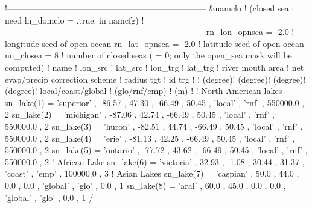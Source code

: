 \documentclass[../main/NEMO_manual]{subfiles}
\begin{document}
\begin{listing}
  \caption{}
  \label{lst:namdom_clo}
  \begin{forlines}
!-----------------------------------------------------------------------
&namclo ! (closed sea : need ln_domclo = .true. in namcfg)
!-----------------------------------------------------------------------
   rn_lon_opnsea = -2.0     ! longitude seed of open ocean
   rn_lat_opnsea = -2.0     ! latitude  seed of open ocean
   nn_closea = 8           ! number of closed seas ( = 0; only the open_sea mask will be computed)
   !                name   ! lon_src ! lat_src ! lon_trg ! lat_trg ! river mouth area   ! net evap/precip correction scheme ! radius tgt   ! id trg
   !                       ! (degree)! (degree)! (degree)! (degree)! local/coast/global ! (glo/rnf/emp)                     !     (m)      !
   ! North American lakes
   sn_lake(1) = 'superior' ,  -86.57 ,  47.30  , -66.49  , 50.45   , 'local'            , 'rnf'                             ,   550000.0 , 2    
   sn_lake(2) = 'michigan' ,  -87.06 ,  42.74  , -66.49  , 50.45   , 'local'            , 'rnf'                             ,   550000.0 , 2    
   sn_lake(3) = 'huron'    ,  -82.51 ,  44.74  , -66.49  , 50.45   , 'local'            , 'rnf'                             ,   550000.0 , 2    
   sn_lake(4) = 'erie'     ,  -81.13 ,  42.25  , -66.49  , 50.45   , 'local'            , 'rnf'                             ,   550000.0 , 2    
   sn_lake(5) = 'ontario'  ,  -77.72 ,  43.62  , -66.49  , 50.45   , 'local'            , 'rnf'                             ,   550000.0 , 2    
   ! African Lake
   sn_lake(6) = 'victoria' ,   32.93 ,  -1.08  ,  30.44  , 31.37   , 'coast'            , 'emp'                             ,   100000.0 , 3    
   ! Asian Lakes
   sn_lake(7) = 'caspian'  ,   50.0  ,  44.0   ,   0.0   ,  0.0    , 'global'           , 'glo'                             ,        0.0 , 1     
   sn_lake(8) = 'aral'     ,   60.0  ,  45.0   ,   0.0   ,  0.0    , 'global'           , 'glo'                             ,        0.0 , 1    
/
   \end{forlines}
\end{listing}
\end{document}
